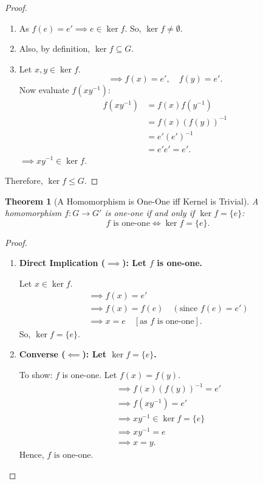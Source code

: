 \documentclass[12pt]{article}
\theoremstyle{definition}
\theoremstyle{plain}
\newtheorem{theorem}{Theorem}[section]
\begin{document}
\begin{proof}
\begin{enumerate}
    \item As $f(e) = e' \implies e \in \ker f$.
    So, $\ker f \neq \emptyset$.
    \item Also, by definition, $\ker f \subseteq G$.
    \item Let $x, y \in \ker f$.
    \[
    \implies f(x) = e', \quad f(y) = e'.
    \]
    Now evaluate $f(x y^{-1})$:
    \begin{align*}
        f(x y^{-1}) &= f(x) f(y^{-1}) \\
        &= f(x) (f(y))^{-1} \\
        &= e' (e')^{-1} \\
        &= e' e' = e'.
    \end{align*}
    $\implies x y^{-1} \in \ker f$.
\end{enumerate}
Therefore, $\boxed{\ker f \le G}$.
\end{proof}

\begin{theorem}[A Homomorphism is One-One iff Kernel is Trivial]
A homomorphism $f: G \longrightarrow G'$ is one-one if and only if $\ker f = \{e\}$:
\[
f \text{ is one-one} \iff \ker f = \{e\}.
\]
\end{theorem}

\begin{proof}
\begin{enumerate}
    \item \textbf{Direct Implication ($\implies$): Let $f$ is one-one.}
    
    Let $x \in \ker f$.
    \begin{align*}
        &\implies f(x) = e' \\
        &\implies f(x) = f(e) \quad (\text{since } f(e) = e') \\
        &\implies x = e \quad [\text{as } f \text{ is one-one}].
    \end{align*}
    So, $\boxed{\ker f = \{e\}}$.

    \item \textbf{Converse ($\impliedby$): Let $\ker f = \{e\}$.}
    
    To show: $f$ is one-one. Let $f(x) = f(y)$.
    \begin{align*}
        &\implies f(x) (f(y))^{-1} = e' \\
        &\implies f(x y^{-1}) = e' \\
        &\implies x y^{-1} \in \ker f = \{e\} \\
        &\implies x y^{-1} = e \\
        &\implies x = y.
    \end{align*}
    Hence, $\boxed{f \text{ is one-one}}$. \qedhere
\end{enumerate}
\end{proof}
\end{document}
